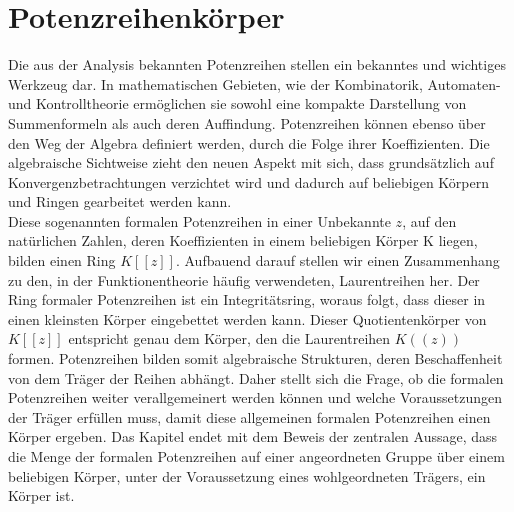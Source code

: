 \chapter{Potenzreihenkörper}\label{chap3}
%
Die aus der Analysis bekannten Potenzreihen stellen ein bekanntes und wichtiges Werkzeug dar. In mathematischen Gebieten, wie der Kombinatorik, Automaten- und Kontrolltheorie ermöglichen sie sowohl eine kompakte Darstellung von Summenformeln als auch deren Auffindung. Potenzreihen können ebenso über den Weg der Algebra definiert werden, durch die Folge ihrer Koeffizienten. Die algebraische Sichtweise zieht den neuen Aspekt mit sich, dass grundsätzlich auf Konvergenzbetrachtungen verzichtet wird und dadurch auf beliebigen Körpern und Ringen gearbeitet werden kann. \\
Diese sogenannten formalen Potenzreihen in einer Unbekannte $z$, auf den natürlichen Zahlen, deren Koeffizienten in einem beliebigen Körper K liegen, bilden einen Ring $K[[z]]$. Aufbauend darauf stellen wir einen Zusammenhang zu den, in der Funktionentheorie häufig verwendeten, Laurentreihen her. Der Ring formaler Potenzreihen ist ein Integritätsring, woraus folgt, dass dieser in einen kleinsten Körper eingebettet werden kann. Dieser Quotientenkörper von $K[[z]]$ entspricht genau dem Körper, den die Laurentreihen $K((z))$ formen. Potenzreihen bilden somit algebraische Strukturen, deren Beschaffenheit von dem Träger der Reihen abhängt. Daher stellt sich die Frage, ob die formalen Potenzreihen weiter verallgemeinert werden können und welche Voraussetzungen der Träger erfüllen muss, damit diese allgemeinen formalen Potenzreihen einen Körper ergeben. Das Kapitel endet mit dem Beweis der zentralen Aussage, dass die Menge der formalen Potenzreihen auf einer angeordneten Gruppe über einem beliebigen Körper, unter der Voraussetzung eines wohlgeordneten Trägers, ein Körper ist.

